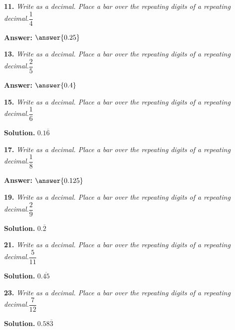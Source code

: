 \documentclass{ximera}
\begin{document}
\begin{problem}
\textbf{11.} \emph{Write as a decimal. Place a bar over the repeating digits of a repeating decimal.}\quad $\dfrac{1}{4}$

\textbf{Answer:} $\answer{0.25}$
\end{problem}

\begin{problem}
\textbf{13.} \emph{Write as a decimal. Place a bar over the repeating digits of a repeating decimal.}\quad $\dfrac{2}{5}$

\textbf{Answer:} $\answer{0.4}$
\end{problem}

\begin{problem}
\textbf{15.} \emph{Write as a decimal. Place a bar over the repeating digits of a repeating decimal.}\quad $\dfrac{1}{6}$

\begin{hint}
\textbf{Solution.} $0.1\overline{6}$
\end{hint}
\end{problem}

\begin{problem}
\textbf{17.} \emph{Write as a decimal. Place a bar over the repeating digits of a repeating decimal.}\quad $\dfrac{1}{8}$

\textbf{Answer:} $\answer{0.125}$
\end{problem}

\begin{problem}
\textbf{19.} \emph{Write as a decimal. Place a bar over the repeating digits of a repeating decimal.}\quad $\dfrac{2}{9}$

\begin{hint}
\textbf{Solution.} $0.\overline{2}$
\end{hint}
\end{problem}

\begin{problem}
\textbf{21.} \emph{Write as a decimal. Place a bar over the repeating digits of a repeating decimal.}\quad $\dfrac{5}{11}$

\begin{hint}
\textbf{Solution.} $0.\overline{45}$
\end{hint}
\end{problem}

\begin{problem}
\textbf{23.} \emph{Write as a decimal. Place a bar over the repeating digits of a repeating decimal.}\quad $\dfrac{7}{12}$

\begin{hint}
\textbf{Solution.} $0.58\overline{3}$
\end{hint}
\end{problem}
\end{document}
